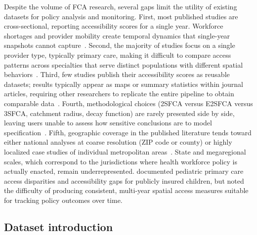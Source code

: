 \documentclass{CUP-JNL-DAP}%
\begin{document}
Despite the volume of FCA research, several gaps limit the utility of existing datasets for policy analysis and monitoring. First, most published studies are cross-sectional, reporting accessibility scores for a single year. Workforce shortages and provider mobility create temporal dynamics that single-year snapshots cannot capture~\citep{buchalter2025}. Second, the majority of studies focus on a single provider type, typically primary care, making it difficult to compare access patterns across specialties that serve distinct populations with different spatial behaviors~\citep{xia2019}. Third, few studies publish their accessibility scores as reusable datasets; results typically appear as maps or summary statistics within journal articles, requiring other researchers to replicate the entire pipeline to obtain comparable data~\citep{saxena2023,daras2019}. Fourth, methodological choices (2SFCA versus E2SFCA versus 3SFCA, catchment radius, decay function) are rarely presented side by side, leaving users unable to assess how sensitive conclusions are to model specification~\citep{saxena2023,mcgrail2009}. Fifth, geographic coverage in the published literature tends toward either national analyses at coarse resolution (ZIP code or county) or highly localized case studies of individual metropolitan areas~\citep{guagliardo2004,xia2019,kang2020}. State and megaregional scales, which correspond to the jurisdictions where health workforce policy is actually enacted, remain underrepresented. \citet{gentili2018} documented pediatric primary care access disparities and accessibility gaps for publicly insured children, but noted the difficulty of producing consistent, multi-year spatial access measures suitable for tracking policy outcomes over time.

\subsection{Dataset introduction}
\end{document}
